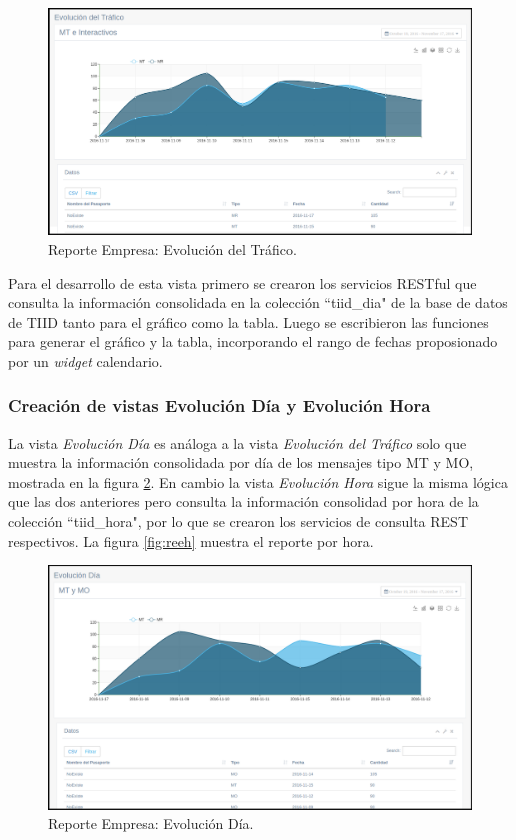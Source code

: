 \begin{figure}[ht]
  \centering
  \includegraphics[scale=0.30,type=png,ext=.png,read=.png]{imagenes/reet}
  \caption{Reporte Empresa: Evolución del Tráfico.}
  \label{fig:reet}
\end{figure}

\indent Para el desarrollo de esta vista primero se crearon los servicios RESTful que consulta la información consolidada en la colección “tiid\_dia" de la base de datos de TIID tanto para el gráfico como la tabla. Luego se escribieron las funciones para generar el gráfico y la tabla, incorporando el rango de fechas proposionado por un \textit{widget} calendario.

\subsubsection{Creación de vistas Evolución Día y Evolución Hora}
\indent La vista \textit{Evolución Día} es análoga a la vista \textit{Evolución del Tráfico} solo que muestra la información consolidada por día de los mensajes tipo MT y MO, mostrada en la figura \ref{fig:reed}. En cambio la vista \textit{Evolución Hora} sigue la misma lógica que las dos anteriores pero consulta la información consolidad por hora de la colección “tiid\_hora", por lo que se crearon los servicios de consulta REST respectivos. La figura \ref{fig:reeh} muestra el reporte por hora.
\begin{figure}[ht]
  \centering
  \includegraphics[scale=0.30,type=png,ext=.png,read=.png]{imagenes/reed}
  \caption{Reporte Empresa: Evolución Día.}
  \label{fig:reed}
\end{figure}

